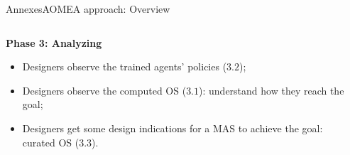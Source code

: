 \begin{frame}{Annexes}{AOMEA approach: Overview}

    \begin{columns}

        \begin{column}{0.6\textwidth}

            \textbf{Phase 3: Analyzing}

            \begin{itemize}
                \item Designers observe the trained agents' policies ($3.2$);
                \item Designers observe the computed OS ($3.1$): understand how they reach the goal;
                \item Designers get some design indications for a MAS to achieve the goal: curated OS ($3.3$).
            \end{itemize}


        \end{column}

        \begin{column}{0.4\textwidth}
            \centering
        \end{column}


\end{columns}
\end{frame}
